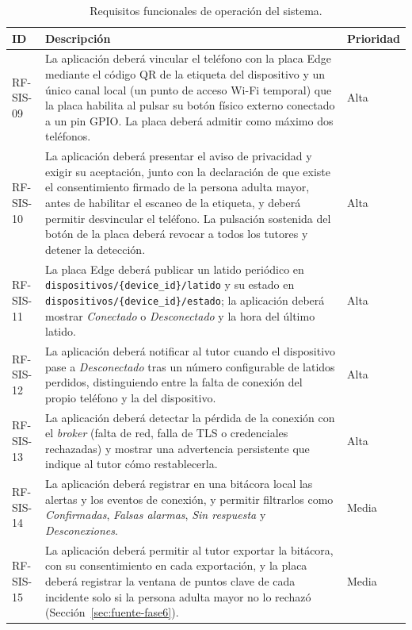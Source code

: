 \documentclass[12pt,a4paper,oneside]{book}
\theoremstyle{plain}
\theoremstyle{definition}
\theoremstyle{remark}
\begin{document}
\begin{table}[H]
\centering
\caption{Requisitos funcionales de operación del sistema.}
\label{tab:rf-sis-op}
\small
\begin{tabular}{L{1.9cm}L{8.2cm}L{1.6cm}}
\toprule
\textbf{ID} & \textbf{Descripción} & \textbf{Prioridad} \\
\midrule
RF-SIS-09 & La aplicación deberá vincular el teléfono con la placa Edge mediante el código QR de la etiqueta del dispositivo y un único canal local (un punto de acceso Wi-Fi temporal) que la placa habilita al pulsar su botón físico externo conectado a un pin GPIO. La placa deberá admitir como máximo dos teléfonos. & Alta \\
\addlinespace
RF-SIS-10 & La aplicación deberá presentar el aviso de privacidad y exigir su aceptación, junto con la declaración de que existe el consentimiento firmado de la persona adulta mayor, antes de habilitar el escaneo de la etiqueta, y deberá permitir desvincular el teléfono. La pulsación sostenida del botón de la placa deberá revocar a todos los tutores y detener la detección. & Alta \\
\addlinespace
RF-SIS-11 & La placa Edge deberá publicar un latido periódico en \texttt{dispositivos/\{device\_id\}/latido} y su estado en \texttt{dispositivos/\{device\_id\}/estado}; la aplicación deberá mostrar \textit{Conectado} o \textit{Desconectado} y la hora del último latido. & Alta \\
\addlinespace
RF-SIS-12 & La aplicación deberá notificar al tutor cuando el dispositivo pase a \textit{Desconectado} tras un número configurable de latidos perdidos, distinguiendo entre la falta de conexión del propio teléfono y la del dispositivo. & Alta \\
\addlinespace
RF-SIS-13 & La aplicación deberá detectar la pérdida de la conexión con el \textit{broker} (falta de red, falla de TLS o credenciales rechazadas) y mostrar una advertencia persistente que indique al tutor cómo restablecerla. & Alta \\
\addlinespace
RF-SIS-14 & La aplicación deberá registrar en una bitácora local las alertas y los eventos de conexión, y permitir filtrarlos como \textit{Confirmadas}, \textit{Falsas alarmas}, \textit{Sin respuesta} y \textit{Desconexiones}. & Media \\
\addlinespace
RF-SIS-15 & La aplicación deberá permitir al tutor exportar la bitácora, con su consentimiento en cada exportación, y la placa deberá registrar la ventana de puntos clave de cada incidente solo si la persona adulta mayor no lo rechazó (Sección~\ref{sec:fuente-fase6}). & Media \\
\bottomrule
\end{tabular}
\end{table}
\end{document}
